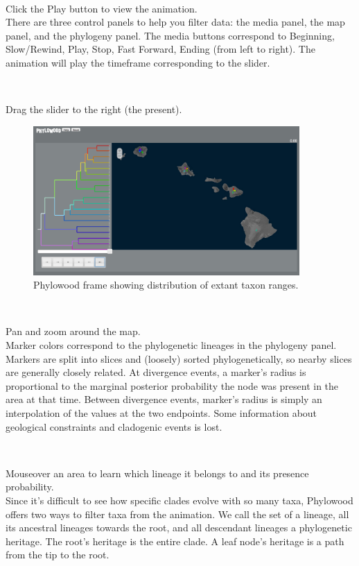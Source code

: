 \documentclass[11pt]{article}
\newcommand{\impmark}{\strut\vadjust{\domark}}
\newcommand{\domark}{%
  \vbox to 0pt{
    \kern-\dp\strutbox
    \smash{\llap{$\rightarrow$\kern1em}}
    \vss
  }%
}
\begin{document}
\noindent \\ \impmark Click the Play button to view the animation. \\

There are three control panels to help you filter data: the media panel, the map panel, and the phylogeny panel.
The media buttons correspond to Beginning, Slow/Rewind, Play, Stop, Fast Forward, Ending (from left to right).
The animation will play the timeframe corresponding to the slider.

\noindent \\ \impmark Drag the slider to the right (the present).

\begin{figure}[H]
\centering
\includegraphics[width=4in]{figures/phw_all}
\caption{Phylowood frame showing distribution of extant taxon ranges.}
\end{figure}

\noindent \\ \impmark Pan and zoom around the map.\\

Marker colors correspond to the phylogenetic lineages in the phylogeny panel.
Markers are split into slices and (loosely) sorted phylogenetically, so nearby slices are generally closely related.
At divergence events, a marker's radius is proportional to the marginal posterior probability the node was present in the area at that time.
Between divergence events, marker's radius is simply an interpolation of the values at the two endpoints.
Some information about geological constraints and cladogenic events is lost.

\noindent \\ \impmark Mouseover an area to learn which lineage it belongs to and its presence probability. \\

Since it's difficult to see how specific clades evolve with so many taxa, Phylowood offers two ways to filter taxa from the animation.
We call the set of a lineage, all its ancestral lineages towards the root, and all descendant lineages a phylogenetic heritage.
The root's heritage is the entire clade.
A leaf node's heritage is a path from the tip to the root.
\end{document}
